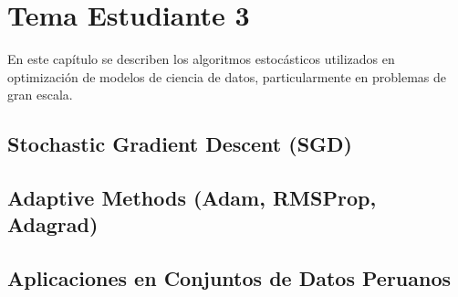 \chapter{Tema Estudiante 3}
\label{chap:3}

En este capítulo se describen los algoritmos estocásticos utilizados 
en optimización de modelos de ciencia de datos, particularmente 
en problemas de gran escala.

\section{Stochastic Gradient Descent (SGD)}

\section{Adaptive Methods (Adam, RMSProp, Adagrad)}

\section{Aplicaciones en Conjuntos de Datos Peruanos}
